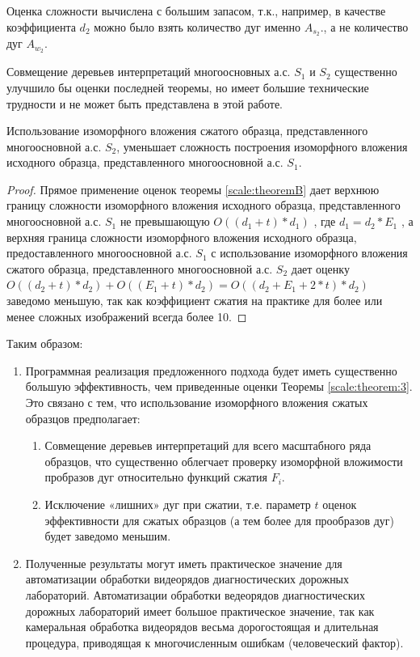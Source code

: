 \begin{remark}
Оценка сложности вычислена с большим запасом, т.к., например, в качестве коэффициента $d_2$  можно было взять количество  дуг именно  $A_{s_2}$., а не количество  дуг  $A_{w_2}$.
\end{remark}

\begin{remark}
Совмещение деревьев интерпретаций   многоосновных  а.с. $S_1$  и  $S_2$ существенно улучшило бы оценки последней теоремы, но имеет большие технические трудности и не может быть представлена  в этой работе.
\end{remark}

\begin{theorem} 
Использование изоморфного вложения сжатого образца, представленного  многоосновной  а.с. $S_2$,  уменьшает сложность построения изоморфного вложения исходного образца, представленного  многоосновной  а.с.  $S_1$.
\label{scale:theorem:3}
\end{theorem}

\begin{proof}
Прямое применение оценок теоремы \ref{scale:theoremB}  дает верхнюю границу сложности изоморфного вложения исходного образца, представленного  многоосновной  а.с. $S_1$  не превышающую $O((d_1 + t)* d_1)$ , где  $d_1 = d_2 * E_1$ , а верхняя граница  сложности изоморфного вложения исходного образца, предоставленного  многоосновной  а.с.   $S_1$  с использование изоморфного вложения сжатого образца, представленного  многоосновной  а.с.  $S_2$ дает оценку $O((d_2 + t)* d_2) +  O((E_1 + t)* d_2) =  O((d_2 + E_1 + 2 * t ) * d_2 )$ заведомо меньшую, так как коэффициент сжатия на практике для более или менее сложных изображений всегда более 10.
\end{proof}
                  
Таким образом:
\begin{enumerate}
\item  Программная реализация предложенного подхода будет иметь существенно большую эффективность, чем приведенные оценки  Теоремы \ref{scale:theorem:3}. Это связано с тем, что использование изоморфного вложения сжатых образцов предполагает:
\begin{enumerate}
\item Совмещение деревьев интерпретаций для всего масштабного ряда образцов, что существенно облегчает проверку изоморфной вложимости пробразов дуг относительно функций сжатия $F_i$. 
\item Исключение «лишних» дуг при сжатии, т.е. параметр $t$ оценок эффективности  для сжатых образцов (а тем более для прообразов дуг) будет заведомо меньшим.  
\end{enumerate}
\item Полученные результаты могут иметь практическое значение для автоматизации обработки видеорядов диагностических дорожных лабораторий.  Автоматизации обработки ведеорядов диагностических дорожных лабораторий имеет большое практическое значение, так как камеральная обработка видеорядов весьма дорогостоящая и длительная процедура, приводящая к многочисленным ошибкам (человеческий фактор).  
\end{enumerate}


